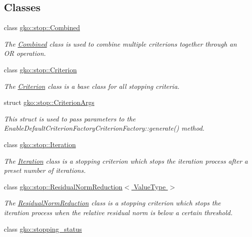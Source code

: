 \subsection*{Classes}
\begin{DoxyCompactItemize}
\item 
class \hyperlink{classgko_1_1stop_1_1Combined}{gko\+::stop\+::\+Combined}
\begin{DoxyCompactList}\small\item\em The \hyperlink{classgko_1_1stop_1_1Combined}{Combined} class is used to combine multiple criterions together through an OR operation. \end{DoxyCompactList}\item 
class \hyperlink{classgko_1_1stop_1_1Criterion}{gko\+::stop\+::\+Criterion}
\begin{DoxyCompactList}\small\item\em The \hyperlink{classgko_1_1stop_1_1Criterion}{Criterion} class is a base class for all stopping criteria. \end{DoxyCompactList}\item 
struct \hyperlink{structgko_1_1stop_1_1CriterionArgs}{gko\+::stop\+::\+Criterion\+Args}
\begin{DoxyCompactList}\small\item\em This struct is used to pass parameters to the Enable\+Default\+Criterion\+Factory\+Criterion\+Factory\+::generate() method. \end{DoxyCompactList}\item 
class \hyperlink{classgko_1_1stop_1_1Iteration}{gko\+::stop\+::\+Iteration}
\begin{DoxyCompactList}\small\item\em The \hyperlink{classgko_1_1stop_1_1Iteration}{Iteration} class is a stopping criterion which stops the iteration process after a preset number of iterations. \end{DoxyCompactList}\item 
class \hyperlink{classgko_1_1stop_1_1ResidualNormReduction}{gko\+::stop\+::\+Residual\+Norm\+Reduction$<$ Value\+Type $>$}
\begin{DoxyCompactList}\small\item\em The \hyperlink{classgko_1_1stop_1_1ResidualNormReduction}{Residual\+Norm\+Reduction} class is a stopping criterion which stops the iteration process when the relative residual norm is below a certain threshold. \end{DoxyCompactList}\item 
class \hyperlink{classgko_1_1stopping__status}{gko\+::stopping\+\_\+status}

\end{DoxyCompactItemize}
